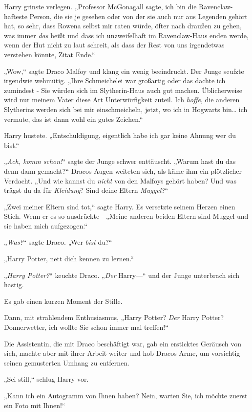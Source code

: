 {Harry grinste verlegen. „Professor McGonagall sagte, ich bin die Ravenclaw-hafteste Person, die sie je gesehen oder von der sie auch nur aus Legenden gehört hat, so sehr, dass Rowena selbst mir raten würde, öfter nach draußen zu gehen, was immer \emph{das} heißt und dass ich unzweifelhaft im Ravenclaw-Haus enden werde, wenn der Hut nicht zu laut schreit, als dass der Rest von uns irgendetwas verstehen könnte, Zitat Ende.“

„Wow,“ sagte Draco Malfoy und klang ein wenig beeindruckt. Der Junge seufzte irgendwie wehmütig. „Ihre Schmeichelei war großartig oder das dachte ich zumindest - Sie würden sich im Slytherin-Haus auch gut machen. Üblicherweise wird nur meinem Vater diese Art Unterwürfigkeit zuteil. Ich \emph{hoffe}, die anderen Slytherins werden sich bei mir einschmeicheln, jetzt, wo ich in Hogwarts bin… ich vermute, das ist dann wohl ein gutes Zeichen.“

Harry hustete. „Entschuldigung, eigentlich habe ich gar keine Ahnung wer du bist.“

„\emph{Ach, komm schon!}“ sagte der Junge schwer enttäuscht. „Warum hast du das denn dann gemacht?“ Dracos Augen weiteten sich, als käme ihm ein plötzlicher Verdacht. „Und wie kannst du \emph{nicht} von den Malfoys gehört haben? Und was trägst du da für \emph{Kleidung}? Sind deine Eltern \emph{Muggel?}“

„Zwei meiner Eltern sind tot,“ sagte Harry. Es versetzte seinem Herzen einen Stich. Wenn er es so ausdrückte - „Meine anderen beiden Eltern sind Muggel und sie haben mich aufgezogen.“

„\emph{Was?}“ sagte Draco. „Wer \emph{bist} du?“

„Harry Potter, nett dich kennen zu lernen.“

„\emph{Harry Potter?}“ keuchte Draco. „\emph{Der} Harry—“ und der Junge unterbrach sich hastig.

Es gab einen kurzen Moment der Stille.

Dann, mit strahlendem Enthusiasmus, „Harry Potter? \emph{Der} Harry Potter? Donnerwetter, ich wollte Sie schon immer mal treffen!“

Die Assistentin, die mit Draco beschäftigt war, gab ein ersticktes Geräusch von sich, machte aber mit ihrer Arbeit weiter und hob Dracos Arme, um vorsichtig seinen gemusterten Umhang zu entfernen.

„Sei still,“ schlug Harry vor.

„Kann ich ein Autogramm von Ihnen haben? Nein, warten Sie, ich möchte zuerst ein Foto mit Ihnen!“

}
